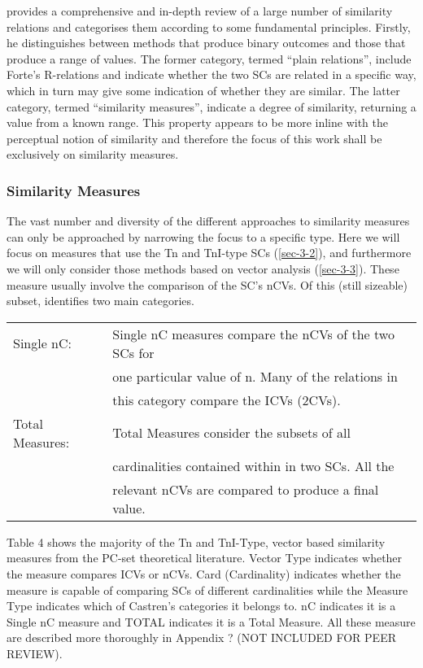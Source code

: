 \documentclass{article}
\begin{document}
\citet{Castren1994} provides a comprehensive and in-depth review of a
large number of similarity relations and categorises them according to
some fundamental principles. Firstly, he distinguishes between methods
that produce binary outcomes and those that produce a range of
values. The former category, termed ``plain relations'', include Forte's
R-relations \citep{Forte1973} and indicate whether the two SCs are
related in a specific way, which in turn may give some indication of
whether they are similar. The latter category, termed ``similarity
measures'', indicate a degree of similarity, returning a value from a
known range. This property appears to be more inline with the
perceptual notion of similarity and therefore the focus of this work
shall be exclusively on similarity measures.
\subsubsection{Similarity Measures}
\label{sec-3-4-2}

The vast number and diversity of the different approaches to similarity
measures can only be approached by narrowing the focus to a specific
type. Here we will focus on measures that use the Tn and TnI-type SCs
(\ref{sec-3-2}), and furthermore we will only consider those
methods based on vector analysis (\ref{sec-3-3}). These measure
usually involve the comparison of the SC's nCVs. Of this (still
sizeable) subset, \citet{Castren1994} identifies two main categories.

\begin{center}
\begin{tabular}{ll}
 Single nC:       &  Single nC measures compare the nCVs of the two SCs for  \\
                  &  one particular value of n. Many of the relations in     \\
                  &  this category compare the ICVs (2CVs).                  \\
 Total Measures:  &  Total Measures consider the subsets of all              \\
                  &  cardinalities contained within in two SCs. All the      \\
                  &  relevant nCVs are compared to produce a final value.    \\
\end{tabular}
\end{center}



Table 4 shows the majority of the Tn and TnI-Type, vector based
similarity measures from the PC-set theoretical literature. Vector
Type indicates whether the measure compares ICVs or nCVs. Card
(Cardinality) indicates whether the measure is capable of comparing
SCs of different cardinalities while the Measure Type indicates which
of Castren's categories it belongs to. nC indicates it is a Single nC
measure and TOTAL indicates it is a Total Measure. All these measure
are described more thoroughly in Appendix ? (NOT INCLUDED FOR PEER
REVIEW).
\end{document}

